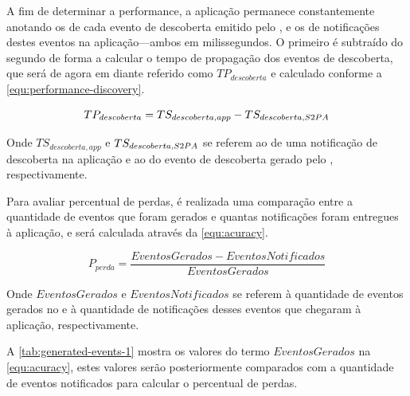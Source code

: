 A fim de determinar a performance, a aplicação permanece constantemente anotando os \timestamps de cada evento de descoberta emitido pelo \stwopa, e os \timestamps de notificações destes eventos na aplicação---ambos em milissegundos. O primeiro \timestamp é subtraído do segundo de forma a calcular o tempo de propagação dos eventos de descoberta, que será de agora em diante referido como $TP_{descoberta}$ e calculado conforme a \autoref{equ:performance-discovery}.

\begin{equation}
	\label{equ:performance-discovery}
	TP_{descoberta} = TS_{descoberta,app} - TS_{descoberta,S2PA}
\end{equation}

Onde $TS_{descoberta,app}$ e $TS_{descoberta,S2PA}$ se referem ao \timestamp de uma notificação de descoberta na aplicação e ao \timestamp do evento de descoberta gerado pelo \stwopa, respectivamente.

Para avaliar percentual de perdas, é realizada uma comparação entre a quantidade de eventos que foram gerados e quantas notificações foram entregues à aplicação, e será calculada através da \autoref{equ:acuracy}.

\begin{equation}
	\label{equ:acuracy}
	P_{perda} = \frac{EventosGerados - EventosNotificados}{EventosGerados}
\end{equation}

Onde $EventosGerados$ e $EventosNotificados$ se referem à quantidade de eventos gerados no \stwopa e à quantidade de notificações desses eventos que chegaram à aplicação, respectivamente.

A \autoref{tab:generated-events-1} mostra os valores do termo $EventosGerados$ na \autoref{equ:acuracy}, estes valores serão posteriormente comparados com a quantidade de eventos notificados para calcular o percentual de perdas.

\begin{table}[htb]
	\begin{center}
	\end{center}
\end{table}


